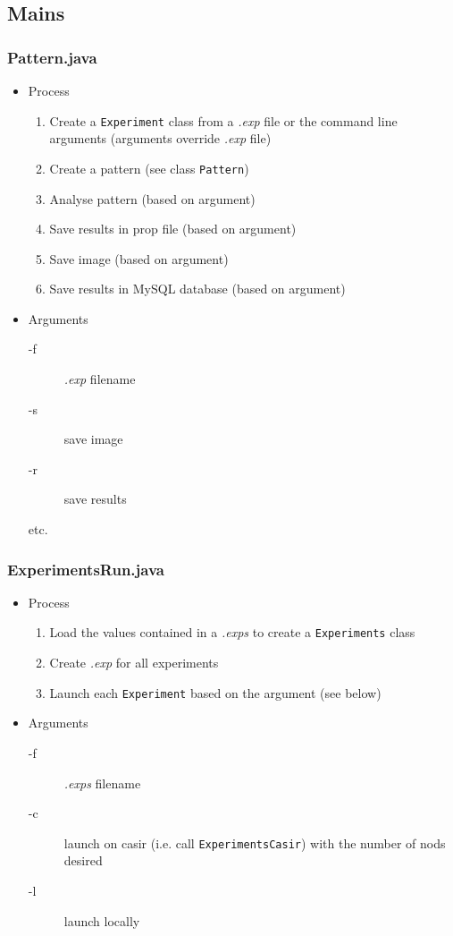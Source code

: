 \documentclass[legalpaper]{article}
\begin{document}
\newpage

\subsection{Mains}

\subsubsection{Pattern.java}
\begin{itemize}
  \item Process
    \begin{enumerate}
      \item Create a \texttt{Experiment} class from a \emph{.exp} file or the command line arguments (arguments override \emph{.exp} file)
      \item Create a pattern (see class \texttt{Pattern})
      \item Analyse pattern (based on argument)
      \item Save results in prop file (based on argument)
      \item Save image (based on argument)
      \item Save results in MySQL database (based on argument)
    \end{enumerate}

  \item Arguments
    \begin{description}
      \item[-f] \emph{.exp} filename
      \item[-s] save image
      \item[-r] save results
      \item[etc.]
    \end{description}
\end{itemize}

\subsubsection{ExperimentsRun.java}
\begin{itemize}
  \item Process
    \begin{enumerate}
      \item Load the values contained in a \emph{.exps} to create a \texttt{Experiments} class
      \item Create \emph{.exp} for all experiments
      \item Launch each \texttt{Experiment} based on the argument (see below)
    \end{enumerate}

  \item{Arguments}
    \begin{description}
      \item[-f] \emph{.exps} filename
      \item[-c] launch on casir (i.e. call \texttt{ExperimentsCasir}) with the number of nods desired
      \item[-l] launch locally
    \end{description}
\end{itemize}
\end{document}
